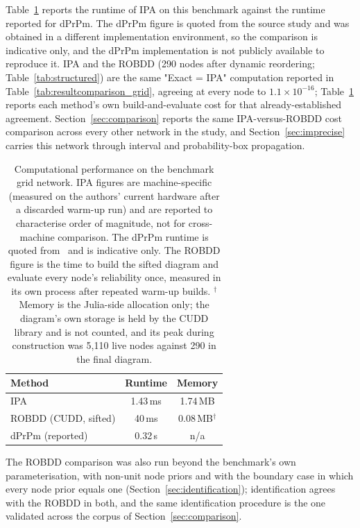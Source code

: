 \documentclass[preprint,12pt]{elsarticle}
\begin{document}
Table~\ref{tab:computation_comparison_grid} reports the runtime of IPA on this benchmark against the runtime reported for dPrPm. The dPrPm figure is quoted from the source study and was obtained in a different implementation environment, so the comparison is indicative only, and the dPrPm implementation is not publicly available to reproduce it. IPA and the ROBDD (290 nodes after dynamic reordering; Table~\ref{tab:structured}) are the same "Exact = IPA" computation reported in Table~\ref{tab:resultcomparison_grid}, agreeing at every node to $1.1\times10^{-16}$; Table~\ref{tab:computation_comparison_grid} reports each method's own build-and-evaluate cost for that already-established agreement. Section~\ref{sec:comparison} reports the same IPA-versus-ROBDD cost comparison across every other network in the study, and Section~\ref{sec:imprecise} carries this network through interval and probability-box propagation.

\begin{table}[ht]
\centering\small
\caption{Computational performance on the benchmark grid network. IPA figures are machine-specific (measured on the authors' current hardware after a discarded warm-up run) and are reported to characterise order of magnitude, not for cross-machine comparison. The dPrPm runtime is quoted from~\cite{tong_probability_2019} and is indicative only. The ROBDD figure is the time to build the sifted diagram and evaluate every node's reliability once, measured in its own process after repeated warm-up builds. $^{\dagger}$Memory is the Julia-side allocation only; the diagram's own storage is held by the CUDD library and is not counted, and its peak during construction was 5{,}110 live nodes against 290 in the final diagram.}
\label{tab:computation_comparison_grid}
\begin{tabular}{lcc}
\toprule
Method & Runtime & Memory \\
\midrule
IPA & 1.43\,ms & 1.74\,MB \\
ROBDD (CUDD, sifted) & 40\,ms & 0.08\,MB$^{\dagger}$ \\
dPrPm (reported) & 0.32\,s & n/a \\
\bottomrule
\end{tabular}
\end{table}

The ROBDD comparison was also run beyond the benchmark's own parameterisation, with non-unit node priors and with the boundary case in which every node prior equals one (Section~\ref{sec:identification}); identification agrees with the ROBDD in both, and the same identification procedure is the one validated across the corpus of Section~\ref{sec:comparison}.
\end{document}
